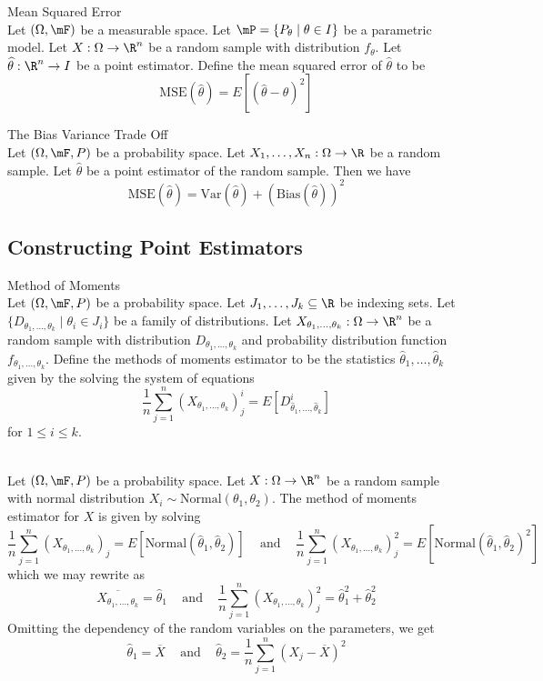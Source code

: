 \documentclass[a4paper]{article}
\begin{document}
\begin{defn}{Mean Squared Error}{}\\
Let $(\Omega,\mF)$ be a measurable space. Let $\mP=\{P_\theta\;|\;\theta\in I\}$ be a parametric model. Let $X:\Omega\to\R^n$ be a random sample with distribution $f_\theta$. Let $\widehat{\theta}:\R^n\to I$ be a point estimator. Define the mean squared error of $\widehat{\theta}$ to be $$\text{MSE}(\widehat{\theta})=E[(\widehat{\theta}-\theta)^2]$$
\end{defn}

\begin{thm}{The Bias Variance Trade Off}{}\\
Let $(\Omega,\mF,P)$ be a probability space. Let $X_1,\dots,X_n:\Omega\to\R$ be a random sample. Let $\widehat{\theta}$ be a point estimator of the random sample. Then we have $$\text{MSE}(\widehat{\theta})=\text{Var}(\widehat{\theta})+(\text{Bias}(\widehat{\theta}))^2$$
\end{thm}

\subsection{Constructing Point Estimators}
\begin{defn}{Method of Moments}{}\\
Let $(\Omega,\mF,P)$ be a probability space. Let $J_1,\dots,J_k\subseteq\R$ be indexing sets. Let $\{D_{\theta_1,\dots,\theta_k}\;|\;\theta_i\in J_i\}$ be a family of distributions. Let $X_{\theta_1,\dots,\theta_k}:\Omega\to\R^n$ be a random sample with distribution $D_{\theta_1,\dots,\theta_k}$ and probability distribution function $f_{\theta_1,\dots,\theta_k}$. Define the methods of moments estimator to be the statistics $\widehat{\theta}_1,\dots,\widehat{\theta}_k$ given by the solving the system of equations $$\frac{1}{n}\sum_{j=1}^n(X_{\theta_1,\dots,\theta_k})_j^i=E[D_{\widehat{\theta}_1,\dots,\widehat{\theta}_k}^i]$$ for $1\leq i\leq k$. 
\end{defn}

\begin{eg}{}{}\\
Let $(\Omega,\mF,P)$ be a probability space. Let $X:\Omega\to\R^n$ be a random sample with normal distribution $X_i\sim\text{Normal}(\theta_1,\theta_2)$. The method of moments estimator for $X$ is given by solving $$\frac{1}{n}\sum_{j=1}^n(X_{\theta_1,\dots,\theta_k})_j=E[\text{Normal}(\widehat{\theta}_1,\widehat{\theta}_2)]\;\;\;\text{ and }\;\;\;\frac{1}{n}\sum_{j=1}^n(X_{\theta_1,\dots,\theta_k})_j^2=E[\text{Normal}(\widehat{\theta}_1,\widehat{\theta}_2)^2]$$ which we may rewrite as $$\overline{X_{\theta_1,\dots,\theta_k}}=\widehat{\theta}_1\;\;\;\text{ and }\;\;\;\frac{1}{n}\sum_{j=1}^n(X_{\theta_1,\dots,\theta_k})_j^2=\widehat{\theta}_1^2+\widehat{\theta}_2^2$$ Omitting the dependency of the random variables on the parameters, we get $$\widehat{\theta}_1=\overline{X}\;\;\;\text{ and }\;\;\;\widehat{\theta}_2=\frac{1}{n}\sum_{j=1}^n(X_j-\overline{X})^2$$
\end{eg}
\end{document}
